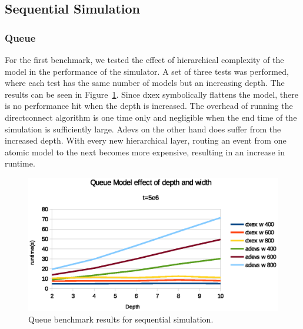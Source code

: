 

\subsection{Sequential Simulation}
\subsubsection{Queue}\label{4-seq-Queue}
For the first benchmark, we tested the effect of hierarchical complexity of the model in the performance of the simulator. A set of three tests was performed, where each test has the same number of models but an increasing depth.
The results can be seen in Figure~\ref{fig:Queue_benchmark_seq}. Since dxex symbolically flattens the model, there is no performance hit when the depth is increased. The overhead of running the directconnect algorithm is one time only and negligible when the end time of the simulation is sufficiently large. Adevs on the other hand does suffer from the increased depth. With every new hierarchical layer, routing an event from one atomic model to the next becomes more expensive, resulting in an increase in runtime.
\begin{figure}
	\center
	\includegraphics[width=\plotfraction\columnwidth]{fig/queue_fixed_sequential.eps}
	\caption{Queue benchmark results for sequential simulation.}
	\label{fig:Queue_benchmark_seq}
\end{figure}
